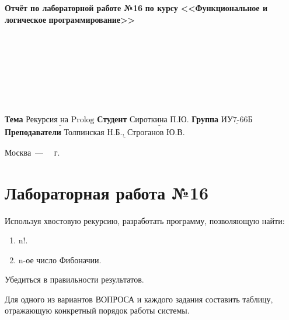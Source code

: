 \documentclass[12pt,a4paper]{scrreprt}
\begin{document}
\begin{titlepage}
		\begin{center}
			\noindent\begin{minipage}{1.3\textwidth}\centering
				\Large\textbf{  Отчёт по лабораторной работе №16}\newline
				\textbf{по курсу}\newline
				\textbf{<<Функциональное и логическое}\newline
				\textbf{\indent\indent\indent программирование>>}\newline
			\end{minipage}
		\end{center}
		
		~\\\\\\\\\\\\\\
		\normalsize
		\noindent\textbf{Тема } $\underline{\text{Рекурсия на Prolog}}$\newline\newline
		\noindent\textbf{Студент } $\underline{\text{Сироткина П.Ю.}}$\newline\newline
		\noindent\textbf{Группа } $\underline{\text{ИУ7-66Б}}$\newline\newline
		\noindent\textbf{Преподаватели } $\underline{\text{Толпинская Н.Б., Строганов Ю.В.}}$\newline
		
		\begin{center}
			\vfill
			Москва~---~\the\year
			~г.
		\end{center}
	\end{titlepage}
	
\chapter*{Лабораторная работа №16}

Используя хвостовую рекурсию, разработать программу, позволяющую найти:

\begin{enumerate}
	\item n!.
	\item n-ое число Фибоначии.
\end{enumerate}

Убедиться в правильности результатов.

Для одного из вариантов ВОПРОСА и каждого задания составить таблицу, отражающую конкретный порядок работы системы.
\end{document}
